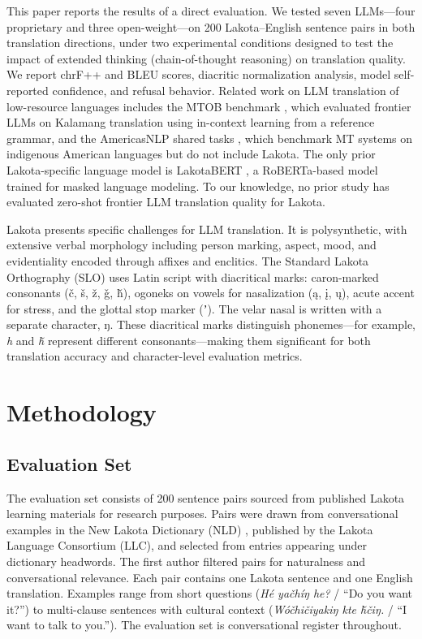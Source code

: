\documentclass[11pt]{article}
\newcommand{\lak}[1]{\textit{#1}}
\begin{document}
This paper reports the results of a direct evaluation. We tested seven LLMs---four proprietary and three open-weight---on 200 Lakota--English sentence pairs in both translation directions, under two experimental conditions designed to test the impact of extended thinking (chain-of-thought reasoning) on translation quality. We report chrF++ and BLEU scores, diacritic normalization analysis, model self-reported confidence, and refusal behavior. Related work on LLM translation of low-resource languages includes the MTOB benchmark \cite{mtob}, which evaluated frontier LLMs on Kalamang translation using in-context learning from a reference grammar, and the AmericasNLP shared tasks \cite{americasnlp2021,americasnlp2023}, which benchmark MT systems on indigenous American languages but do not include Lakota. The only prior Lakota-specific language model is LakotaBERT \cite{lakotabert}, a RoBERTa-based model trained for masked language modeling. To our knowledge, no prior study has evaluated zero-shot frontier LLM translation quality for Lakota.

Lakota presents specific challenges for LLM translation. It is polysynthetic, with extensive verbal morphology including person marking, aspect, mood, and evidentiality encoded through affixes and enclitics. The Standard Lakota Orthography (SLO) uses Latin script with diacritical marks: caron-marked consonants (č, š, ž, ǧ, ȟ), ogoneks on vowels for nasalization (ą, į, ų), acute accent for stress, and the glottal stop marker (ʼ). The velar nasal is written with a separate character, ŋ. These diacritical marks distinguish phonemes---for example, \textit{h} and \textit{ȟ} represent different consonants---making them significant for both translation accuracy and character-level evaluation metrics.

\section{Methodology}

\subsection{Evaluation Set}

The evaluation set consists of 200 sentence pairs sourced from published Lakota learning materials for research purposes. Pairs were drawn from conversational examples in the New Lakota Dictionary (NLD) \cite{nld}, published by the Lakota Language Consortium (LLC), and selected from entries appearing under dictionary headwords. The first author filtered pairs for naturalness and conversational relevance. Each pair contains one Lakota sentence and one English translation. Examples range from short questions (\lak{Hé yačhíŋ he?} / ``Do you want it?'') to multi-clause sentences with cultural context (\lak{Wóčhičiyakiŋ kte ȟčiŋ.} / ``I want to talk to you.''). The evaluation set is conversational register throughout.
\end{document}
